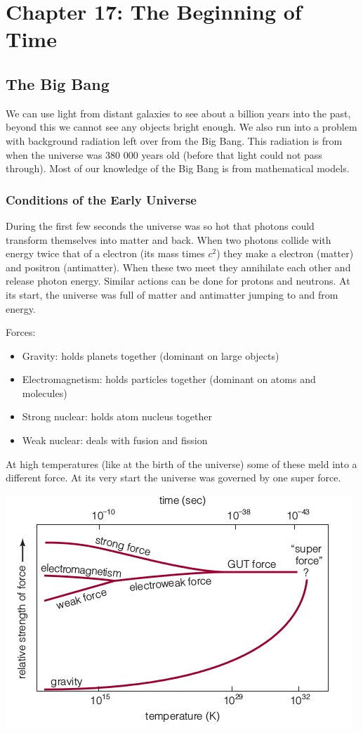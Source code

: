 \section{Chapter 17: The Beginning of Time}
\subsection{The Big Bang}
We can use light from distant galaxies to see about a billion years into the past, beyond this we cannot see any objects bright enough. We also run into a problem with background radiation left over from the Big Bang. This radiation is from when the universe was 380 000 years old (before that light could not pass through). Most of our knowledge of the Big Bang is from mathematical models.

\subsubsection{Conditions of the Early Universe}
During the first few seconds the universe was so hot that photons could transform themselves into matter and back. When two photons collide with energy twice that of a electron (its mass times $c^2$) they make a electron (matter) and positron (antimatter). When these two meet they annihilate each other and release photon energy. Similar actions can be done for protons and neutrons. At its start, the universe was full of matter and antimatter jumping to and from energy.

Forces:
\begin{itemize}
\item Gravity: holds planets together (dominant on large objects)
\item Electromagnetism: holds particles together (dominant on atoms and molecules)
\item Strong nuclear: holds atom nucleus together
\item Weak nuclear: deals with fusion and fission
\end{itemize}

At high temperatures (like at the birth of the universe) some of these meld into a different force. At its very start the universe was governed by one super force.

\includegraphics[scale=0.5]{forces}

